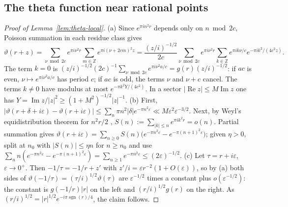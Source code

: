\documentclass[11pt]{amsart}
\newcommand{\ZZ}{\mathbb Z}
\newcommand{\eps}{\varepsilon}
\renewcommand{\Re}{\operatorname{Re}}
\renewcommand{\Im}{\operatorname{Im}}
\newcommand{\sgn}{\operatorname{sgn}}
\theoremstyle{definition}
\theoremstyle{remark}
\numberwithin{equation}{section}
\begin{document}
\subsection{The theta function near rational points}\label{app:proofs-theta}
\begin{proof}[Proof of Lemma~\textup{\ref{lem:theta-local}}]
(a) Since $e^{\pi in^2r}$ depends only on $n\bmod 2c$, Poisson summation in each residue class gives
\[
\vartheta(r+z)=\sum_{\nu\bmod 2c}e^{\pi i\nu^2r}\sum_{m\in\ZZ}e^{\pi i(\nu+2cm)^2z}
=\frac{(z/i)^{-1/2}}{2c}\sum_{\nu\bmod2c}e^{\pi i\nu^2r}\sum_{k\in\ZZ}e^{\pi ik\nu/c}e^{-\pi ik^2/(4c^2z)} .
\]
The term $k=0$ is $(z/i)^{-1/2}(2c)^{-1}\sum_{\nu\bmod2c}e^{\pi i\nu^2a/c}=g(r)(z/i)^{-1/2}$: if $ac$ is even, $\nu\mapsto e^{\pi i\nu^2a/c}$ has period
$c$; if $ac$ is odd, the terms $\nu$ and $\nu+c$ cancel. The terms $k\ne0$ have modulus at most $e^{-\pi k^2Y/(4c^2)}$. In a sector
$|\Re z|\le M\Im z$ one has $Y=\Im z/|z|^2\ge(1+M^2)^{-1/2}|z|^{-1}$.
(b) First, $|\vartheta(r+\delta+i\eps)-\vartheta(r+i\eps)|\le\sum_n\pi n^2|\delta|e^{-\pi n^2\eps}\ll M\eps^2\eps^{-3/2}$. Next, by Weyl's
equidistribution theorem for $n^2r/2$ \cite[Ch.~1, Theorems~2.1 and~3.2]{KN74}, $S(n):=\sum_{|k|\le n}e^{\pi ik^2r}=o(n)$. Partial summation gives
$\vartheta(r+i\eps)=\sum_{n\ge0}S(n)\big(e^{-\pi n^2\eps}-e^{-\pi(n+1)^2\eps}\big)$; given $\eta>0$, split at $n_0$ with $|S(n)|\le\eta n$ for $n\ge n_0$ and use
$\sum_nn(e^{-\pi n^2\eps}-e^{-\pi(n+1)^2\eps})=\sum_{n\ge1}e^{-\pi n^2\eps}\le(2\eps)^{-1/2}$.
(c) Let $\tau=r+i\eps$, $\eps\to0^+$. Then $-1/\tau=-1/r+z'$ with $z'/i=\eps r^{-2}(1+O(\eps))$, so by (a) both sides of
$\vartheta(-1/\tau)=(\tau/i)^{1/2}\vartheta(\tau)$ are $\eps^{-1/2}$ times a constant plus $o(\eps^{-1/2})$: the constant is $g(-1/r)|r|$ on the left
and $(r/i)^{1/2}g(r)$ on the right. As $(r/i)^{1/2}=|r|^{1/2}e^{-i\pi\sgn(r)/4}$, the claim follows.
\end{proof}
\end{document}
